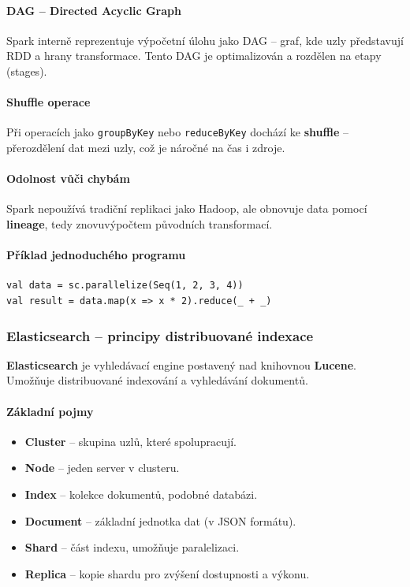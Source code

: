 \paragraph{DAG – Directed Acyclic Graph}
Spark interně reprezentuje výpočetní úlohu jako DAG – graf, kde uzly představují RDD a hrany transformace. Tento DAG je optimalizován a rozdělen na etapy (stages).

\paragraph{Shuffle operace}
Při operacích jako \texttt{groupByKey} nebo \texttt{reduceByKey} dochází ke \textbf{shuffle} – přerozdělení dat mezi uzly, což je náročné na čas i zdroje.

\paragraph{Odolnost vůči chybám}
Spark nepoužívá tradiční replikaci jako Hadoop, ale obnovuje data pomocí \textbf{lineage}, tedy znovuvýpočtem původních transformací.

\paragraph{Příklad jednoduchého programu}
\begin{verbatim}
val data = sc.parallelize(Seq(1, 2, 3, 4))
val result = data.map(x => x * 2).reduce(_ + _)
\end{verbatim}

\subsubsection*{Elasticsearch – principy distribuované indexace}

\textbf{Elasticsearch} je vyhledávací engine postavený nad knihovnou \textbf{Lucene}. Umožňuje distribuované indexování a vyhledávání dokumentů.

\paragraph{Základní pojmy}
\begin{itemize}
    \item \textbf{Cluster} – skupina uzlů, které spolupracují.
    \item \textbf{Node} – jeden server v clusteru.
    \item \textbf{Index} – kolekce dokumentů, podobné databázi.
    \item \textbf{Document} – základní jednotka dat (v JSON formátu).
    \item \textbf{Shard} – část indexu, umožňuje paralelizaci.
    \item \textbf{Replica} – kopie shardu pro zvýšení dostupnosti a výkonu.
\end{itemize}

